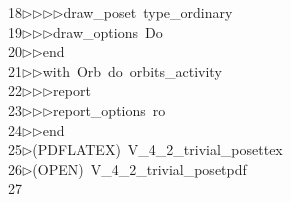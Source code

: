 \begin{tabbing}
18\>$\triangleright$\>$\triangleright$\>$\triangleright$\>$\triangleright$\>draw\_poset\ type\_ordinary\ \\[0pt]
19\>$\triangleright$\>$\triangleright$\>$\triangleright$\>draw\_options\ Do\ \\[0pt]
20\>$\triangleright$\>$\triangleright$\>end\ \\[0pt]
21\>$\triangleright$\>$\triangleright$\>with\ Orb\ do\ orbits\_activity\ \\[0pt]
22\>$\triangleright$\>$\triangleright$\>$\triangleright$\>report\ \ \\[0pt]
23\>$\triangleright$\>$\triangleright$\>$\triangleright$\>report\_options\ ro\ \\[0pt]
24\>$\triangleright$\>$\triangleright$\>end\ \\[0pt]
25\>$\triangleright$\>(PDFLATEX)\ V\_4\_2\_trivial\_posettex\\[0pt]
26\>$\triangleright$\>(OPEN)\ V\_4\_2\_trivial\_posetpdf\\[0pt]
27\>\end{tabbing}

